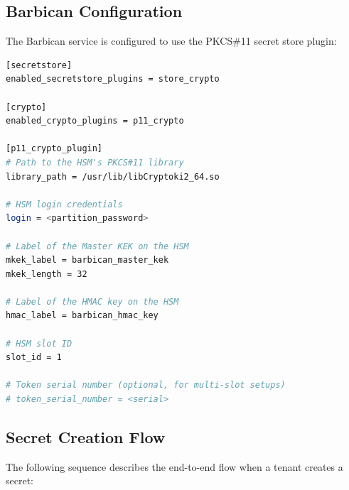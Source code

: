 \documentclass[12pt,a4paper,oneside]{report}
\begin{document}
\subsection{Barbican Configuration}

The Barbican service is configured to use the PKCS\#11 secret store plugin:

\begin{lstlisting}[language=bash, caption={barbican.conf — PKCS\#11 Plugin Configuration}]
[secretstore]
enabled_secretstore_plugins = store_crypto

[crypto]
enabled_crypto_plugins = p11_crypto

[p11_crypto_plugin]
# Path to the HSM's PKCS#11 library
library_path = /usr/lib/libCryptoki2_64.so

# HSM login credentials
login = <partition_password>

# Label of the Master KEK on the HSM
mkek_label = barbican_master_kek
mkek_length = 32

# Label of the HMAC key on the HSM
hmac_label = barbican_hmac_key

# HSM slot ID
slot_id = 1

# Token serial number (optional, for multi-slot setups)
# token_serial_number = <serial>
\end{lstlisting}

\subsection{Secret Creation Flow}

The following sequence describes the end-to-end flow when a tenant creates a secret:
\end{document}
